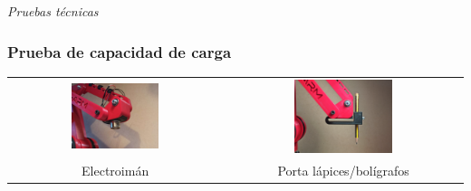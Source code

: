 \documentclass{beamer}
\begin{document}
\section*{}
\begin{frame}{}
  \centering \Huge
  \emph{Pruebas técnicas}
\end{frame}

\begin{frame}
  \frametitle{Prueba de capacidad de carga}
  \begin{table}[htbp]
    \centering
    \begin{tabular}{cc}
        \includegraphics[width=0.43\textwidth, valign=m]{figs/electromagnet_tool.jpeg} & \includegraphics[width=0.43\textwidth, valign=m]{figs/pen_tool.jpg}  \\
        Electroimán & Porta lápices/bolígrafos
    \end{tabular}
  \end{table}  
\end{frame}
\end{document}

